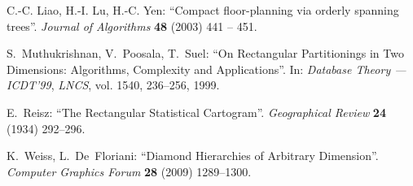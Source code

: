 \documentclass[12pt]{article}
\begin{document}
\begin{thebibliography}{10}
C.-C. Liao, H.-I. Lu, H.-C. Yen: \enquote{Compact floor-planning via orderly
  spanning trees}.
\newblock \emph{Journal of Algorithms} \textbf{48} (2003) 441 -- 451.

S.~Muthukrishnan, V.~Poosala, T.~Suel: \enquote{On Rectangular Partitionings in
  Two Dimensions: Algorithms, Complexity and Applications}.
\newblock In: \emph{Database Theory --- ICDT'99}, \emph{LNCS}, vol. 1540,
  236--256, 1999.

E.~Reisz: \enquote{The Rectangular Statistical Cartogram}.
\newblock \emph{Geographical Review} \textbf{24} (1934) 292--296.

K.~Weiss, L.~De~Floriani: \enquote{Diamond Hierarchies of Arbitrary Dimension}.
\newblock \emph{Computer Graphics Forum} \textbf{28} (2009) 1289--1300.

\end{thebibliography}
\end{document}
